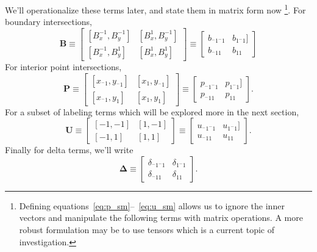 We'll operationalize these terms later, and state them in matrix form now \footnote{
    Defining equations~\ref{eq:p_sm}--~\ref{eq:u_sm} allows us
    to ignore the inner vectors and manipulate the following terms
    with matrix operations.  A more robust formulation may be to
    use tensors which is a current topic of investigation.
  }.  For boundary intersections,
\begin{equation}
  \mathbf{B} \equiv \begin{bmatrix}
    [B_x^{-1}, B_y^{-1}] & [B_x^{1}, B_y^{-1}] \\
    [B_x^{-1}, B_y^{1}] & [B_x^{1}, B_y^{1}]
    \end{bmatrix} \equiv \begin{bmatrix}
      b_{^-1^-1} & b_{1^-1}] \\
      b_{^-11} & b_{11}
      \end{bmatrix}
      \label{eq:B}
\end{equation}
For interior point intersections,
\begin{equation}
  \mathbf{P} \equiv \begin{bmatrix}
    [x_{^-1}, y_{^-1}] & [x_1, y_{^-1}] \\
    [x_{^-1}, y_1] & [x_1, y_1]
  \end{bmatrix} \equiv \begin{bmatrix}
    p_{^-1^-1} & p_{1^-1}] \\
    p_{^-11} & p_{11}
    \end{bmatrix}.
  \label{eq:P}
\end{equation}
For a subset of labeling terms which will be explored
more in the next section,
\begin{equation}
\mathbf{U} \equiv \begin{bmatrix}
  [-1, -1] & [1, -1] \\
  [-1, 1] & [1, 1]
  \end{bmatrix} \equiv \begin{bmatrix}
    u_{^-1^-1} & u_{1^-1}] \\
    u_{^-11} & u_{11}
    \end{bmatrix}.
  \label{eq:indices}
\end{equation}
Finally for delta terms, we'll write
\begin{equation}
  \mathbf{\Delta} \equiv \begin{bmatrix}
    \delta_{^-1^-1} & \delta_{1^-1} \\
    \delta_{^-11} & \delta_{11}
    \end{bmatrix}.
    \label{eq:D}
\end{equation}
